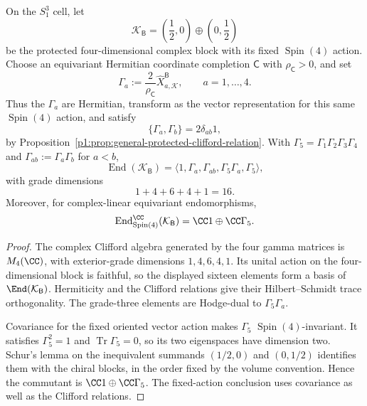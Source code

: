 \documentclass[11pt]{article}
\begin{document}
\begin{proposition}
\label{p1:prop:math-protected-clifford-fierz}
On the \(S^3_1\) cell, let
\[
  \mathcal K_{\mathsf B}=\left(\frac12,0\right)\oplus\left(0,\frac12\right)
\]
be the protected four-dimensional complex block with its fixed
\(\operatorname{Spin}(4)\) action.  Choose an equivariant Hermitian coordinate completion
\(\mathsf C\) with \(\rho_{\mathsf C}>0\), and set
\[
 \Gamma_a:=\frac{2}{\rho_{\mathsf C}}
 \widehat X_{a,\mathcal K}^{\mathsf B},\qquad a=1,\ldots,4.
\]
Thus the \(\Gamma_a\) are Hermitian, transform as the vector representation
for this same \(\operatorname{Spin}(4)\) action, and satisfy
\[
  \{\Gamma_a,\Gamma_b\}=2\delta_{ab}1,
\]
by Proposition~\ref{p1:prop:general-protected-clifford-relation}.
With \(\Gamma_5=\Gamma_1\Gamma_2\Gamma_3\Gamma_4\) and
\(\Gamma_{ab}:=\Gamma_a\Gamma_b\) for \(a<b\),
\[
  \operatorname{End}(\mathcal K_{\mathsf B})
  =\langle 1,\Gamma_a,\Gamma_{ab},\Gamma_5\Gamma_a,\Gamma_5\rangle,
\]
with grade dimensions
\[
  1+4+6+4+1=16.
\]
Moreover, for complex-linear equivariant endomorphisms,
\[
  \operatorname{End}_{\operatorname{Spin}(4)}^{\CC}(\mathcal K_{\mathsf B})=\CC 1\oplus\CC\Gamma_5.
\]
\end{proposition}

\begin{proof}
The complex Clifford algebra generated by the four gamma matrices is
\(M_4(\CC)\), with exterior-grade dimensions \(1,4,6,4,1\).  Its unital
action on the four-dimensional block is faithful, so the displayed sixteen
elements form a basis of \(\End(\mathcal K_{\mathsf B})\).  Hermiticity and
the Clifford relations give their Hilbert--Schmidt trace orthogonality.  The
grade-three elements are Hodge-dual to \(\Gamma_5\Gamma_a\).

Covariance for the fixed oriented vector action makes \(\Gamma_5\)
\(\operatorname{Spin}(4)\)-invariant.  It satisfies \(\Gamma_5^2=1\) and
\(\operatorname{Tr}\Gamma_5=0\), so its two eigenspaces have dimension two.
Schur's lemma on the inequivalent summands \((1/2,0)\) and \((0,1/2)\)
identifies them with the chiral blocks, in the order fixed by the volume
convention.  Hence the commutant is \(\CC1\oplus\CC\Gamma_5\).
The fixed-action conclusion uses covariance as well as the Clifford
relations.
\end{proof}
\end{document}

